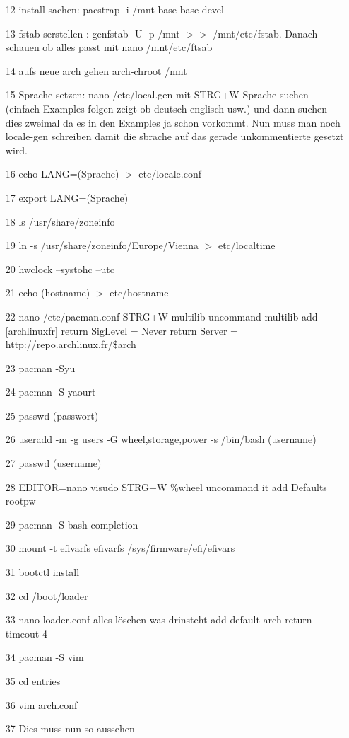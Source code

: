 \documentclass[a4paper,12pt]{article}
\begin{document}
\begin{itemize}
	\item[12] install sachen: pacstrap -i /mnt base base-devel
	\item[13] fstab serstellen : genfstab -U -p /mnt $>>$ /mnt/etc/fstab. Danach schauen ob alles passt mit nano /mnt/etc/ftsab
	\item[14] aufs neue arch gehen arch-chroot /mnt
	\item[15] Sprache setzen: nano /etc/local.gen mit STRG+W Sprache suchen (einfach Examples folgen zeigt ob deutsch englisch usw.) und dann suchen dies zweimal da es in den Examples ja schon vorkommt. Nun muss man noch locale-gen schreiben damit die sbrache auf das gerade unkommentierte gesetzt wird.
	\item[16] echo LANG=(Sprache) $>$ etc/locale.conf
	\item[17] export LANG=(Sprache) 
	\item[18] ls /usr/share/zoneinfo
	\item[19] ln -s /usr/share/zoneinfo/Europe/Vienna $>$ etc/localtime
	\item[20] hwclock --systohc --utc
	\item[21] echo (hostname) $>$ etc/hostname
	\item[22] nano /etc/pacman.conf        STRG+W multilib      uncommand multilib       add [archlinuxfr] return SigLevel = Never return Server = http://repo.archlinux.fr/\$arch
	\item[23] pacman -Syu
	\item[24] pacman -S yaourt
	\item[25] passwd (passwort)
	\item[26] useradd -m -g users -G wheel,storage,power -s /bin/bash (username)
	\item[27] passwd	(username)
	\item[28] EDITOR=nano visudo       STRG+W \%wheel     uncommand it       add       Defaults rootpw
	\item[29] pacman -S bash-completion
	\item[30] mount -t efivarfs efivarfs /sys/firmware/efi/efivars
	\item[31] bootctl install
	\item[32] cd /boot/loader
	\item[33] nano loader.conf       alles löschen was drinsteht       add   default arch return timeout 4
	\item[34] pacman -S vim
	\item[35] cd entries
	\item[36] vim arch.conf
	\item[37] Dies muss nun so aussehen

\end{itemize}
\end{document}
